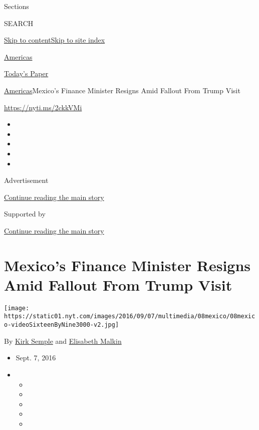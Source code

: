 Sections

SEARCH

\protect\hyperlink{site-content}{Skip to
content}\protect\hyperlink{site-index}{Skip to site index}

\href{https://www.nytimes.com/section/world/americas}{Americas}

\href{https://myaccount.nytimes.com/auth/login?response_type=cookie\&client_id=vi}{}

\href{https://www.nytimes.com/section/todayspaper}{Today's Paper}

\href{/section/world/americas}{Americas}\textbar{}Mexico's Finance
Minister Resigns Amid Fallout From Trump Visit

\url{https://nyti.ms/2ckkVMi}

\begin{itemize}
\item
\item
\item
\item
\item
\end{itemize}

Advertisement

\protect\hyperlink{after-top}{Continue reading the main story}

Supported by

\protect\hyperlink{after-sponsor}{Continue reading the main story}

\hypertarget{mexicos-finance-minister-resigns-amid-fallout-from-trump-visit}{%
\section{Mexico's Finance Minister Resigns Amid Fallout From Trump
Visit}\label{mexicos-finance-minister-resigns-amid-fallout-from-trump-visit}}

\texttt{[image: https://static01.nyt.com/images/2016/09/07/multimedia/08mexico/08mexico-videoSixteenByNine3000-v2.jpg]}

By \href{http://www.nytimes.com/by/kirk-semple}{Kirk Semple} and
\href{https://www.nytimes.com/by/elisabeth-malkin}{Elisabeth Malkin}

\begin{itemize}
\item
  Sept. 7, 2016
\item
  \begin{itemize}
  \item
  \item
  \item
  \item
  \item
  \end{itemize}
\end{itemize}

